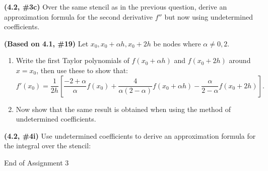 \documentclass{eh-homework}
\begin{document}
\begin{question}{4}
\textbf{(4.2, \#3c)} Over the same stencil as in the previous question, derive an approximation formula for the second derivative \( f'' \) but now using undetermined coefficients.
\end{question}

\begin{question}{5}
\textbf{(Based on 4.1, \#19)} Let \( x_0, x_0 + \alpha h, x_0 + 2h \) be nodes where \( \alpha \neq 0,2 \).

\begin{center}
\end{center}

\begin{enumerate}[label=\alph*.]
    \item Write the first Taylor polynomials of \( f(x_0 +\alpha h) \) and \( f(x_0 +2h) \) around \( x = x_0 \), then use these to show that:
    \[
    f'(x_0) = \frac{1}{2h} \left[ \frac{-2+\alpha}{\alpha} f(x_0) + \frac{4}{\alpha(2-\alpha)} f(x_0 + \alpha h) - \frac{\alpha}{2-\alpha} f(x_0 + 2h) \right].
    \]

    \item Now show that the same result is obtained when using the method of undetermined coefficients.
\end{enumerate}
\end{question}

\begin{question}{6}
\textbf{(4.2, \#4i)} Use undetermined coefficients to derive an approximation formula for the integral over the stencil:

\begin{center}
\end{center}

\end{question}

\vfill
\centerline{End of Assignment 3}
\end{document}
